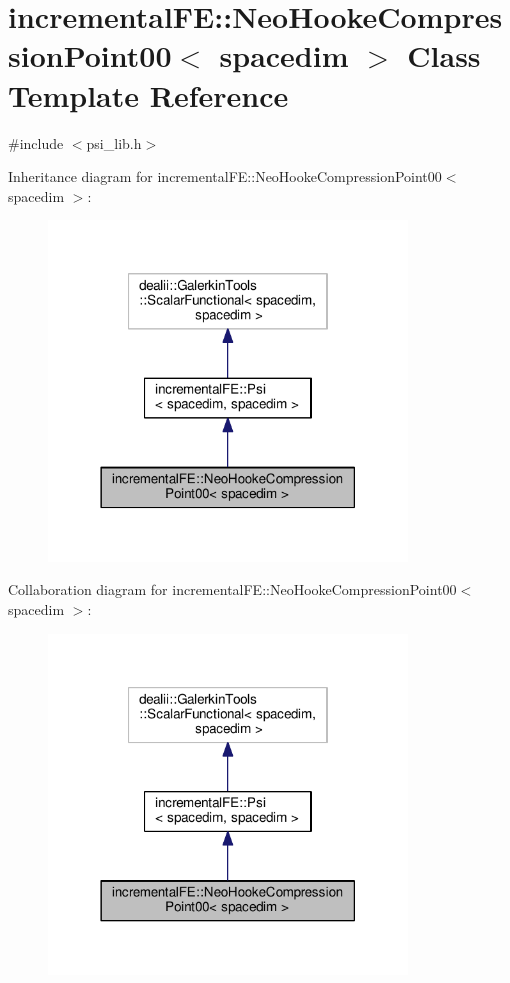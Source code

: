 \hypertarget{classincremental_f_e_1_1_neo_hooke_compression_point00}{}\section{incremental\+FE\+:\+:Neo\+Hooke\+Compression\+Point00$<$ spacedim $>$ Class Template Reference}
\label{classincremental_f_e_1_1_neo_hooke_compression_point00}


{\ttfamily \#include $<$psi\+\_\+lib.\+h$>$}



Inheritance diagram for incremental\+FE\+:\+:Neo\+Hooke\+Compression\+Point00$<$ spacedim $>$\+:\nopagebreak
\begin{figure}[H]
\begin{center}
\leavevmode
\includegraphics[width=270pt]{classincremental_f_e_1_1_neo_hooke_compression_point00__inherit__graph}
\end{center}
\end{figure}


Collaboration diagram for incremental\+FE\+:\+:Neo\+Hooke\+Compression\+Point00$<$ spacedim $>$\+:\nopagebreak
\begin{figure}[H]
\begin{center}
\leavevmode
\includegraphics[width=270pt]{classincremental_f_e_1_1_neo_hooke_compression_point00__coll__graph}
\end{center}
\end{figure}
